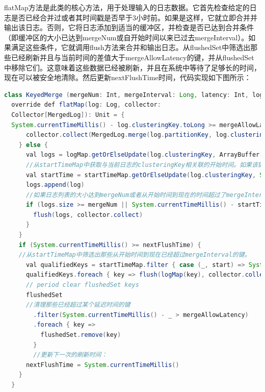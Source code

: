 \begin{longtable}[htbp]
flatMap方法是此类的核心方法，用于处理输入的日志数据。它首先检查给定的日志是否已经合并过或者其时间戳是否早于3小时前。如果是这样，它就立即合并并输出该日志。否则，它将日志添加到适当的缓冲区，并检查是否已达到合并条件（即缓冲区的大小已达到mergeNum或自开始时间以来已过去mergeInterval）。如果满足这些条件，它就调用flush方法来合并和输出日志。从flushedSet中筛选出那些已经刷新并且与当前时间的差值大于mergeAllowLatency的键，并从flushedSet中移除它们。这意味着这些数据已经被刷新，并且在系统中等待了足够长的时间，现在可以被安全地清除。然后更新nextFlushTime时间，代码实现如下图所示：

\begin{lrbox}{\datajuheluoji}  
\begin{lstlisting}[language=Java]  
class KeyedMerge (mergeNum: Int, mergeInterval: Long, latency: Int, logRate: Int) extends RichFlatMapFunction[Log, MergedLog] with Logging {
  override def flatMap(log: Log, collector: 
  Collector[MergedLog]): Unit = {
  System.currentTimeMillis() - log.clusteringKey.toLong >= mergeAllowLatency) {
      collector.collect(MergedLog.merge(log.partitionKey, log.clusteringKey, Seq(log)))
    } else {
      val logs = logMap.getOrElseUpdate(log.clusteringKey, ArrayBuffer[Log]())
      //从startTimeMap中获取与当前日志的clusteringKey相关联的开始时间。如果该键不存在，则使用当前时间作为开始时间并与之关联。
      val startTime = startTimeMap.getOrElseUpdate(log.clusteringKey, System.currentTimeMillis())
      logs.append(log)
      //如果日志列表的大小达到mergeNum或者从开始时间到现在的时间超过了mergeInterval，则调用flush方法处理这些日志，并使用collector收集结果。
      if (logs.size >= mergeNum || System.currentTimeMillis() - startTime >= mergeInterval) {
        flush(logs, collector.collect)
      }
    }
    if (System.currentTimeMillis() >= nextFlushTime) {
    //从startTimeMap中筛选出那些从开始时间到现在已经超过mergeInterval的键。
      val qualifiedKeys = startTimeMap.filter { case (_, start) => System.currentTimeMillis() - start >= mergeInterval }.keys
      qualifiedKeys.foreach { key => flush(logMap(key), collector.collect) }
      // period clear flushedSet keys
      flushedSet
      //清理那些已经超过某个延迟时间的键
        .filter(System.currentTimeMillis() - _ > mergeAllowLatency)
        .foreach { key =>
          flushedSet.remove(key)
        }
        //更新下一次的刷新时间：
      nextFlushTime = System.currentTimeMillis()
    }
  }
\end{lstlisting}  
\end{lrbox} 
\begin{table}[h]   
\caption{数据聚合处理逻辑}  
\label{tab:datajuheluoji}  
\usebox{\datajuheluoji}  
\end{table} 



\end{longtable}

